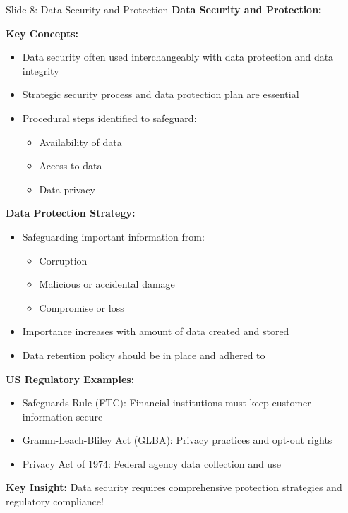 \documentclass[8pt]{beamer}
\begin{document}
	\begin{frame}{Slide 8: Data Security and Protection}
		\fontsize{6.5}{7.5}\selectfont
		\textbf{Data Security and Protection:}
		
		\vspace{0.1cm}
		\textbf{Key Concepts:}
		\begin{itemize}
			\item Data security often used interchangeably with data protection and data integrity
			\item Strategic security process and data protection plan are essential
			\item Procedural steps identified to safeguard:
			\begin{itemize}
				\item Availability of data
				\item Access to data
				\item Data privacy
			\end{itemize}
		\end{itemize}
		
		\vspace{0.1cm}
		\textbf{Data Protection Strategy:}
		\begin{itemize}
			\item Safeguarding important information from:
			\begin{itemize}
				\item Corruption
				\item Malicious or accidental damage
				\item Compromise or loss
			\end{itemize}
			\item Importance increases with amount of data created and stored
			\item Data retention policy should be in place and adhered to
		\end{itemize}
		
		\vspace{0.1cm}
		\textbf{US Regulatory Examples:}
		\begin{itemize}
			\item Safeguards Rule (FTC): Financial institutions must keep customer information secure
			\item Gramm-Leach-Bliley Act (GLBA): Privacy practices and opt-out rights
			\item Privacy Act of 1974: Federal agency data collection and use
		\end{itemize}
		
		\textcolor{myblue}{\textbf{Key Insight:}} Data security requires \textcolor{myblue}{comprehensive protection strategies and regulatory compliance}!
	\end{frame}
	
\end{document}
